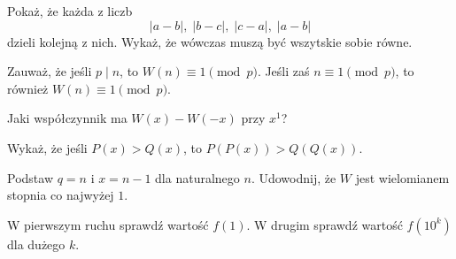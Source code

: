 
\begin{hints_list}
	\item Pokaż, że każda z liczb
	\[
		|a - b|, \;|b - c|,\; |c - a|,\; |a - b|
	\]
	dzieli kolejną z nich. Wykaż, że wówczas muszą być wszytskie sobie równe.
	\item Zauważ, że jeśli $p \mid n$, to $ W(n) \equiv 1 \pmod{p}$. Jeśli zaś $n \equiv 1 \pmod{p}$,  to również $ W(n) \equiv 1 \pmod{p}$.
	\item Jaki współczynnik ma $W(x) - W(-x)$ przy $x^1$?
	\item Wykaż, że jeśli $P(x) > Q(x)$, to $P(P(x)) > Q(Q(x))$.
	\item Podstaw $q = n$ i $x = n - 1$ dla naturalnego $n$. Udowodnij, że $W$ jest wielomianem stopnia co najwyżej $1$.
	\item W pierwszym ruchu sprawdź wartość $f(1)$. W drugim sprawdź wartość $f(10^k)$ dla dużego $k$.
\end{hints_list}